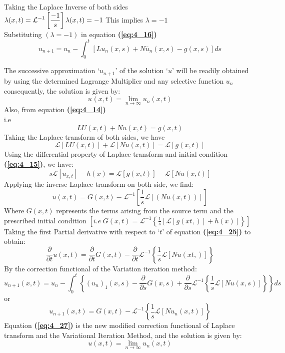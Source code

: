 \documentclass[12pt]{report}
\newcommand{\Laplace}{\mathcal{L}}
\newcommand{\sbracket}[1]{\left[#1\right]}
\newcommand{\Un}[2]{u_{#1}(#2)}
\newcommand{\NI}{\noindent}
\newcommand{\InverseL}[1]{\Laplace^{-1}\left[#1\right]}
\newcommand{\LT}[1]{\Laplace \left[#1\right]}
\newcommand{\Unx}[1]{\Un{#1}{x,t}}
\newcommand{\InverseLx}[1]{\Laplace^{-1}\left\{ #1 \right\}}
\newcommand{\bt}[1]{\textbf{#1}}
\newcommand{\refn}[1]{\bt{(\ref{#1})}}
\begin{document}
\NI Taking the Laplace Inverse of both sides\\[0.2cm]
$\displaystyle
\lambda(x,t) = \InverseL{\frac{-1}{s}} \\[0.2cm]
\lambda(x,t) = - 1  \\[0.2cm]
$
This implies $\lambda = -1$\\[0.3cm]

\NI Substituting $(\lambda = -1)$ in equation \refn{eq:4_16}\\[0.2cm]
\begin{equation}
	u_{n+1} = u_n - \int_{0}^{t} \sbracket{L\Un{n}{x,s} + N\bar{u}_{n}(x,s) - g(x,s)}ds \label{eq:4_22}
\end{equation}

\NI The successive approximation `$u_{n+1}$' of the solution `$u$' will be readily obtained by using the determined Lagrange Multiplier and any selective function $u_n$ consequently, the solution is given by: 
$$
\Un{}{x,t} = \lim\limits_{n \rightarrow \infty}\Un{n}{x,t}
$$
Also, from equation \refn{eq:4_14}\\
i.e\;
\begin{equation}
	LU(x,t) + Nu(x,t) = g(x,t)
\end{equation}
Taking the Laplace transform of both sides, we have
$$
\LT{LU(x,t)} + \LT{Nu(x,t)} = \LT{g(x,t)}
$$
Using the differential property of Laplace transform and initial condition \refn{eq:4_15}, we have:
\begin{equation}
	s\LT{u_{x,t}} - h(x) = \LT{g(x,t)} - \LT{Nu(x,t)} 
\end{equation}
Applying the inverse Laplace transform on both side, we find:
\begin{equation}
	u(x,t) = G(x,t) - \InverseL{\frac{1}{s}\LT{(Nu(x,t))}} \label{eq:4_25}
\end{equation}
Where $G(x,t)$ represents the terms arising from the source term and the prescribed initial condition $\displaystyle \sbracket{ i.e \; G(x,t) = \Laplace^{-1}\left\{\frac{1}{s}\sbracket{\LT{g(xt,)}+ h(x)}\right\}}$\\[0.3cm]

\NI Taking the first Partial derivative with respect to `$t$' of equation \refn{eq:4_25} to obtain:
\begin{equation}
	\frac{\partial}{\partial t}u(x,t) = \frac{\partial}{\partial t}G(x,t) - \frac{\partial}{\partial t}\Laplace^{-1}\left\{ \frac{1}{s}\LT{Nu(xt,)}\right\}
\end{equation}
By the correction functional of the Variation iteration method:
$$
\Unx{n+1} = u_n - \int_{0}^{t}\left\{ (u_n)_{1}(x,s) - \frac{\partial}{\partial s}G(x,s) + \frac{\partial}{\partial s}\InverseLx{\frac{1}{s} \LT{Nu(x,s)}} \right\}ds
$$
or
\begin{equation}
	\Unx{n+1} = G(x,t) - \InverseLx{\frac{1}{s}\LT{N\Un{n}{x,t}}} \label{eq:4_27}
\end{equation}
Equation \refn{eq:4_27} is the new modified correction functional of Laplace transform and the Variational Iteration Method, and the solution is given by:
\begin{equation}
	u(x,t) = \lim\limits_{n \rightarrow \infty} \Unx{n}
\end{equation}
\end{document}
